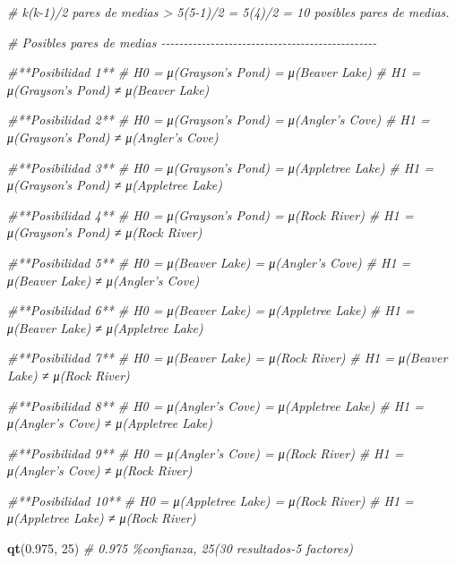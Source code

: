 \documentclass[
]{article}
\newenvironment{Shaded}{\begin{snugshade}}{\end{snugshade}}
\newcommand{\CommentTok}[1]{\textcolor[rgb]{0.56,0.35,0.01}{\textit{#1}}}
\newcommand{\DecValTok}[1]{\textcolor[rgb]{0.00,0.00,0.81}{#1}}
\newcommand{\FloatTok}[1]{\textcolor[rgb]{0.00,0.00,0.81}{#1}}
\newcommand{\FunctionTok}[1]{\textcolor[rgb]{0.13,0.29,0.53}{\textbf{#1}}}
\newcommand{\NormalTok}[1]{#1}
\begin{document}
\begin{Shaded}
\begin{Highlighting}[]
\CommentTok{\# k(k{-}1)/2 pares de medias \textgreater{} 5(5{-}1)/2 = 5(4)/2 = 10 posibles pares de medias.}


\CommentTok{\# Posibles pares de medias {-}{-}{-}{-}{-}{-}{-}{-}{-}{-}{-}{-}{-}{-}{-}{-}{-}{-}{-}{-}{-}{-}{-}{-}{-}{-}{-}{-}{-}{-}{-}{-}{-}{-}{-}{-}{-}{-}{-}{-}{-}{-}{-}{-}{-}{-}{-}{-}}

\CommentTok{\#**Posibilidad 1**}
\CommentTok{\# H0 = μ(Grayson’s Pond) = μ(Beaver Lake)}
\CommentTok{\# H1 = μ(Grayson’s Pond) ≠ μ(Beaver Lake)}

\CommentTok{\#**Posibilidad 2**}
\CommentTok{\# H0 = μ(Grayson’s Pond) = μ(Angler’s Cove)}
\CommentTok{\# H1 = μ(Grayson’s Pond) ≠ μ(Angler’s Cove)}

\CommentTok{\#**Posibilidad 3**}
\CommentTok{\# H0 = μ(Grayson’s Pond) = μ(Appletree Lake)}
\CommentTok{\# H1 = μ(Grayson’s Pond) ≠ μ(Appletree Lake)}

\CommentTok{\#**Posibilidad 4**}
\CommentTok{\# H0 = μ(Grayson’s Pond) = μ(Rock River)}
\CommentTok{\# H1 = μ(Grayson’s Pond) ≠ μ(Rock River)}

\CommentTok{\#**Posibilidad 5**}
\CommentTok{\# H0 = μ(Beaver Lake) = μ(Angler’s Cove)}
\CommentTok{\# H1 = μ(Beaver Lake) ≠ μ(Angler’s Cove)}

\CommentTok{\#**Posibilidad 6**}
\CommentTok{\# H0 = μ(Beaver Lake) = μ(Appletree Lake)}
\CommentTok{\# H1 = μ(Beaver Lake) ≠ μ(Appletree Lake)}

\CommentTok{\#**Posibilidad 7**}
\CommentTok{\# H0 = μ(Beaver Lake) = μ(Rock River)}
\CommentTok{\# H1 = μ(Beaver Lake) ≠ μ(Rock River)}

\CommentTok{\#**Posibilidad 8**}
\CommentTok{\# H0 = μ(Angler’s Cove) = μ(Appletree Lake)}
\CommentTok{\# H1 = μ(Angler’s Cove) ≠ μ(Appletree Lake)}

\CommentTok{\#**Posibilidad 9**}
\CommentTok{\# H0 = μ(Angler’s Cove) = μ(Rock River)}
\CommentTok{\# H1 = μ(Angler’s Cove) ≠ μ(Rock River)}

\CommentTok{\#**Posibilidad 10**}
\CommentTok{\# H0 = μ(Appletree Lake) = μ(Rock River)}
\CommentTok{\# H1 = μ(Appletree Lake) ≠ μ(Rock River)}

\FunctionTok{qt}\NormalTok{(}\FloatTok{0.975}\NormalTok{, }\DecValTok{25}\NormalTok{) }\CommentTok{\# 0.975 \%confianza, 25(30 resultados{-}5 factores)}
\end{Highlighting}
\end{Shaded}
\end{document}
